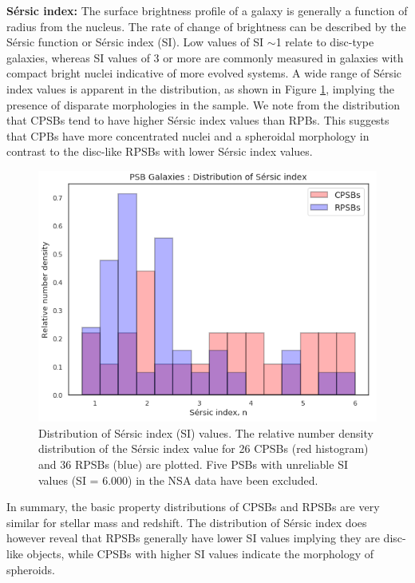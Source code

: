\textbf{S\'ersic index:} The surface brightness profile of a galaxy is generally a function of radius from the nucleus. The rate of change of brightness can be described by the S\'ersic function or S\'ersic index (SI). Low values of SI $\sim$1 relate to disc-type galaxies, whereas SI values of 3 or more are commonly measured in galaxies with compact bright nuclei indicative of more evolved systems. A wide range of S\'ersic index values is apparent in the distribution, as shown in Figure \ref{fig:Sersic-plot}, implying the presence of disparate morphologies in the sample. We note from the distribution that CPSBs tend to have higher S\'ersic index values than RPBs. This suggests that CPBs have more concentrated nuclei and a spheroidal morphology in contrast to the disc-like RPSBs with lower S\'ersic index values.

\begin{figure}
    \centering
    \includegraphics[width=\columnwidth]{images/JupyterPlots/Dist-Sersic-Index-All.png}
    \caption[Comparison of the distribution of S\'ersic index values of CPSBs and RPSBs]{Distribution of S\'ersic index (SI) values. The relative number density distribution of the S\'ersic index value for 26 CPSBs (red histogram) and 36 RPSBs (blue) are plotted. Five PSBs with unreliable SI values (SI = 6.000) in the NSA data  have been excluded.}
    \label{fig:Sersic-plot}
\end{figure}

In summary, the basic property distributions of CPSBs and RPSBs are very similar for stellar mass and redshift. The distribution of S\'ersic index does however reveal that RPSBs generally have lower SI values implying they are disc-like objects, while CPSBs with higher SI values indicate the morphology of spheroids.

